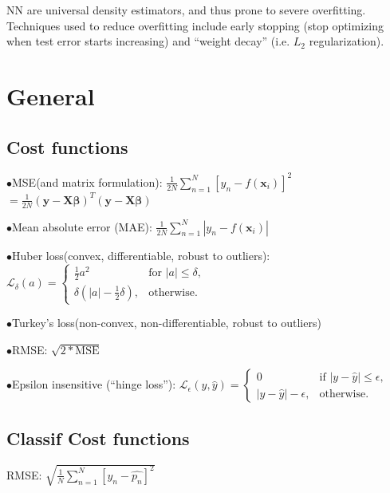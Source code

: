 \documentclass[10pt,a4paper,landscape]{article}
\renewcommand{\bf}[1]{\ensuremath{\mathbf{#1}}}
\newcommand{\bbeta}{\boldsymbol\beta}
\begin{document}
\begin{multicols*}{6}
NN are universal density estimators, and thus prone to severe overfitting. Techniques used to reduce overfitting include early stopping (stop optimizing when test error starts increasing) and ``weight decay'' (i.e. $L_2$ regularization).





\section{General}

\subsection{Cost functions}


$\bullet$MSE(and matrix formulation): $\frac{1}{2N} \sum_{n=1}^{N}\left[y_n-f(\bf{x}_i) \right]^2$
$=\frac{1}{2N} (\bf{y - X \bbeta})^T (\bf{y - X \bbeta})$

$\bullet$Mean absolute error (MAE): $\frac{1}{2N} \sum_{n=1}^{N}\left | y_n-f(\bf{x}_i) \right |$

$\bullet$Huber loss(convex, differentiable, robust to outliers): 
$\mathcal{L}_\delta (a) = \begin{cases}
\frac{1}{2}{a^2}                   & \text{for } |a| \le \delta, \\
\delta (|a| - \frac{1}{2}\delta ), & \text{otherwise.}
\end{cases}$

$\bullet$Turkey's loss(non-convex, non-differentiable, robust to outliers)

$\bullet$RMSE: $\sqrt{2 * \text{MSE}}$

$\bullet$Epsilon insensitive (``hinge loss''):
$\mathcal{L}_{\epsilon}(y, \hat{y}) = \begin{cases}
0                   & \text{if } |y - \hat y| \le \epsilon, \\
|y - \hat y| - \epsilon, & \text{otherwise.}
\end{cases}$

\subsection{Classif Cost functions}
RMSE: $\sqrt{\frac{1}{N} \sum_{n=1}^{N}\left[y_n- \hat{p_n} \right]^2}$


\end{multicols*}
\end{document}
